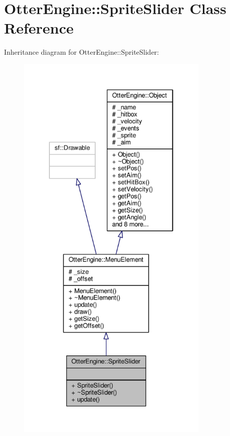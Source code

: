 \hypertarget{class_otter_engine_1_1_sprite_slider}{}\section{Otter\+Engine\+:\+:Sprite\+Slider Class Reference}
\label{class_otter_engine_1_1_sprite_slider}


Inheritance diagram for Otter\+Engine\+:\+:Sprite\+Slider\+:\nopagebreak
\begin{figure}[H]
\begin{center}
\leavevmode
\includegraphics[height=550pt]{de/dbd/class_otter_engine_1_1_sprite_slider__inherit__graph}
\end{center}
\end{figure}


